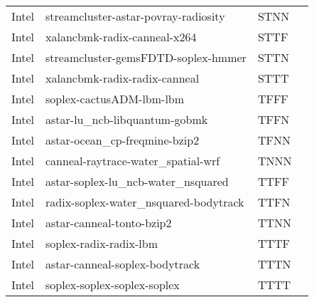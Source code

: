 \begin{table}[htb]
\begin{tabular}{@{}lllr@{}}
            Intel & streamcluster-astar-povray-radiosity & STNN \\
            Intel & xalancbmk-radix-canneal-x264 & STTF \\
            Intel & streamcluster-gemsFDTD-soplex-hmmer & STTN \\
            Intel & xalancbmk-radix-radix-canneal & STTT \\
            Intel & soplex-cactusADM-lbm-lbm & TFFF \\
            Intel & astar-lu\_ncb-libquantum-gobmk & TFFN \\
            Intel & astar-ocean\_cp-freqmine-bzip2 & TFNN \\
            Intel & canneal-raytrace-water\_spatial-wrf & TNNN \\
            Intel & astar-soplex-lu\_ncb-water\_nsquared & TTFF \\
            Intel & radix-soplex-water\_nsquared-bodytrack & TTFN \\
            Intel & astar-canneal-tonto-bzip2 & TTNN \\
            Intel & soplex-radix-radix-lbm & TTTF \\
            Intel & astar-canneal-soplex-bodytrack & TTTN \\
            Intel & soplex-soplex-soplex-soplex & TTTT \\
        
        \bottomrule
    \end{tabular}
    \label{tab: classes-Intel}
\end{table}
 
